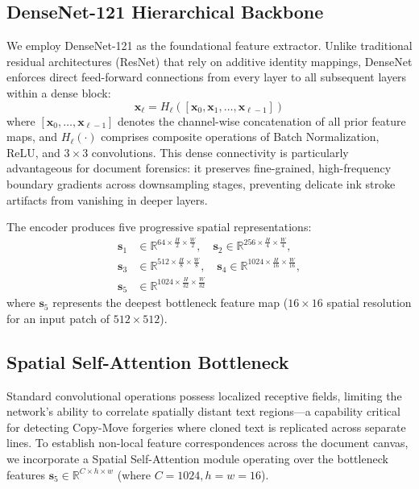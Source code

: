 \documentclass[pdflatex,sn-mathphys-num,iicol]{sn-jnl}
\begin{document}
\subsection{DenseNet-121 Hierarchical Backbone}\label{subsec4_2}
We employ DenseNet-121 \cite{bib14} as the foundational feature extractor. Unlike traditional residual architectures (ResNet) that rely on additive identity mappings, DenseNet enforces direct feed-forward connections from every layer to all subsequent layers within a dense block:
\begin{equation}
\mathbf{x}_\ell = H_\ell([\mathbf{x}_0, \mathbf{x}_1, \dots, \mathbf{x}_{\ell-1}])\label{eq_dense}
\end{equation}
where $[\mathbf{x}_0, \dots, \mathbf{x}_{\ell-1}]$ denotes the channel-wise concatenation of all prior feature maps, and $H_\ell(\cdot)$ comprises composite operations of Batch Normalization, ReLU, and $3 \times 3$ convolutions. This dense connectivity is particularly advantageous for document forensics: it preserves fine-grained, high-frequency boundary gradients across downsampling stages, preventing delicate ink stroke artifacts from vanishing in deeper layers.

The encoder produces five progressive spatial representations:
\begin{align}
\mathbf{s}_1 &\in \mathbb{R}^{64 \times \frac{H}{2} \times \frac{W}{2}}, \quad \mathbf{s}_2 \in \mathbb{R}^{256 \times \frac{H}{4} \times \frac{W}{4}}, \nonumber \\
\mathbf{s}_3 &\in \mathbb{R}^{512 \times \frac{H}{8} \times \frac{W}{8}}, \quad \mathbf{s}_4 \in \mathbb{R}^{1024 \times \frac{H}{16} \times \frac{W}{16}}, \nonumber \\
\mathbf{s}_5 &\in \mathbb{R}^{1024 \times \frac{H}{32} \times \frac{W}{32}}\label{eq_features}
\end{align}
where $\mathbf{s}_5$ represents the deepest bottleneck feature map ($16 \times 16$ spatial resolution for an input patch of $512 \times 512$).

\subsection{Spatial Self-Attention Bottleneck}\label{subsec4_3}
Standard convolutional operations possess localized receptive fields, limiting the network's ability to correlate spatially distant text regions---a capability critical for detecting Copy-Move forgeries where cloned text is replicated across separate lines. To establish non-local feature correspondences across the document canvas, we incorporate a Spatial Self-Attention module \cite{bib15} operating over the bottleneck features $\mathbf{s}_5 \in \mathbb{R}^{C \times h \times w}$ (where $C = 1024, h = w = 16$).
\end{document}
